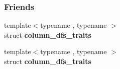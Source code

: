 \subsubsection*{Friends}
\begin{DoxyCompactItemize}
\item 
\mbox{\label{group___sparse_l_u___module_aeb52445d9b5f3ca9a6e74be2e7e42e12}} 
{\footnotesize template$<$typename , typename $>$ }\\struct {\bfseries column\+\_\+dfs\+\_\+traits}
\item 
\mbox{\label{group___sparse_l_u___module_a708684128d95d277ba0bdb45f72f4dba}} 
{\footnotesize template$<$typename , typename $>$ }\\struct {\bfseries column\+\_\+dfs\+\_\+traits}
\end{DoxyCompactItemize}


